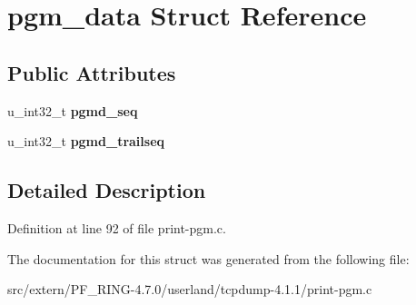 \hypertarget{structpgm__data}{
\section{pgm\_\-data Struct Reference}
\label{structpgm__data}
}
\subsection*{Public Attributes}
\begin{DoxyCompactItemize}
\item 
\hypertarget{structpgm__data_aa868bf4b91b753c3d38a8ee75f50474b}{
u\_\-int32\_\-t {\bfseries pgmd\_\-seq}}
\label{structpgm__data_aa868bf4b91b753c3d38a8ee75f50474b}

\item 
\hypertarget{structpgm__data_a21b91f7f0d23b91977243468c23d3c70}{
u\_\-int32\_\-t {\bfseries pgmd\_\-trailseq}}
\label{structpgm__data_a21b91f7f0d23b91977243468c23d3c70}

\end{DoxyCompactItemize}


\subsection{Detailed Description}


Definition at line 92 of file print-\/pgm.c.



The documentation for this struct was generated from the following file:\begin{DoxyCompactItemize}
\item 
src/extern/PF\_\-RING-\/4.7.0/userland/tcpdump-\/4.1.1/print-\/pgm.c\end{DoxyCompactItemize}

